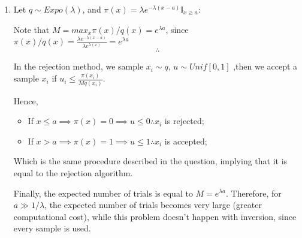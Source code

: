 \documentclass[12pt,letterpaper]{article}
\begin{document}
\begin{enumerate}[leftmargin=!,labelindent=5pt]
    \item Let $q \sim Expo(\lambda)$, and
    $\pi(x) = \lambda e^{-\lambda(x-a)}\mathbb{I}_{x\geq a}$:

    Note that $M = max_x\pi(x)/q(x) = e^{\lambda a}$, since
    $\pi(x)/q(x)
    = \frac{\lambda e^{-\lambda (x-a)}}{\lambda e^{\lambda (x)}}=
    e^{\lambda a}$
    $$\therefore$$

    In the rejection method, we sample $x_i \sim q$, $u \sim Unif[0,1]$
    ,then we accept a sample $x_i$ if
    $u_i \leq \frac{\pi(x_i)}{Mq(x_i)}$. 

    Hence,
    \begin{itemize}
    	\item If $x \leq a \implies \pi(x) = 0 \implies
    	u \leq 0 \therefore x_i$ is rejected;
    	\item If $x > a \implies \pi(x) = 1
    	\implies u \leq 1 \therefore x_i$ is accepted;
    \end{itemize}

    Which is the same procedure described in the question, implying that
    it is equal to the rejection algorithm.

    Finally, the expected number of trials is equal to $M = e^{\lambda a}$.
    Therefore, for $a \gg 1/\lambda$, the expected number of trials becomes 
    very large (greater computational cost), while this problem doesn't
    happen with inversion, since every sample is used.

\end{enumerate}

\newpage
\end{document}
